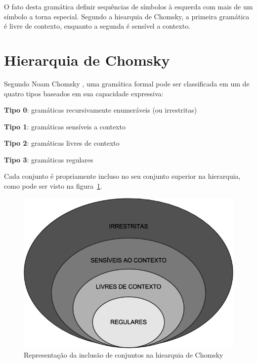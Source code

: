\documentclass[a4paper,12pt,oneside,onecolumn]{uerj}
\begin{document}
O fato desta gramática definir sequências de símbolos à esquerda com mais de um símbolo a torna especial. Segundo a hiearquia de Chomsky, a primeira gramática é livre de contexto, enquanto a segunda é sensível a contexto.

\section{Hierarquia de Chomsky}

Segundo Noam Chomsky \cite{bib:Chomsky57}, uma gramática formal pode ser classificada em um de quatro tipos baseados em sua capacidade expressiva:

\begin{lcircp}
    \item {\bf Tipo 0}: gramáticas recursivamente enumeráveis (ou irrestritas)
    \item {\bf Tipo 1}: gramáticas sensíveis a contexto
    \item {\bf Tipo 2}: gramáticas livres de contexto
    \item {\bf Tipo 3}: gramáticas regulares
\end{lcircp}

Cada conjunto é propriamente incluso no seu conjunto superior na hierarquia, como pode ser visto na figura~\ref{fig:chomsky}.

\begin{figure}[ht]
  \centering
  \includegraphics[scale=0.5]{figures/chomsky.png}
  \caption{Representação da inclusão de conjuntos na hiearquia de Chomsky}
  \label{fig:chomsky}
\end{figure}
\end{document}
